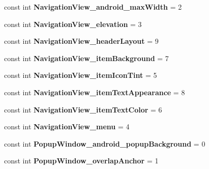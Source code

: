 \begin{DoxyCompactItemize}
const int {\bfseries Navigation\+View\+\_\+android\+\_\+max\+Width} = 2
\item 
\mbox{\label{classXaria_1_1Resource_1_1Styleable_a99ddb40bf037709e678ea5a047f14268}} 
const int {\bfseries Navigation\+View\+\_\+elevation} = 3
\item 
\mbox{\label{classXaria_1_1Resource_1_1Styleable_acf9b70f1c281cb2323373664add60218}} 
const int {\bfseries Navigation\+View\+\_\+header\+Layout} = 9
\item 
\mbox{\label{classXaria_1_1Resource_1_1Styleable_a54bf1ad19ae53e6af6b626752db2a416}} 
const int {\bfseries Navigation\+View\+\_\+item\+Background} = 7
\item 
\mbox{\label{classXaria_1_1Resource_1_1Styleable_a7035fa24c2b69324fc7e63e33483752f}} 
const int {\bfseries Navigation\+View\+\_\+item\+Icon\+Tint} = 5
\item 
\mbox{\label{classXaria_1_1Resource_1_1Styleable_a4ce8339706bb1667fe0dbda9e85a2028}} 
const int {\bfseries Navigation\+View\+\_\+item\+Text\+Appearance} = 8
\item 
\mbox{\label{classXaria_1_1Resource_1_1Styleable_a1bad9d366a692fdf337557ac25cd14fa}} 
const int {\bfseries Navigation\+View\+\_\+item\+Text\+Color} = 6
\item 
\mbox{\label{classXaria_1_1Resource_1_1Styleable_a169ab48e20eacafcbe71a1fc6fea90f0}} 
const int {\bfseries Navigation\+View\+\_\+menu} = 4
\item 
\mbox{\label{classXaria_1_1Resource_1_1Styleable_a0b62981e68137582e148b4e149d1d42d}} 
const int {\bfseries Popup\+Window\+\_\+android\+\_\+popup\+Background} = 0
\item 
\mbox{\label{classXaria_1_1Resource_1_1Styleable_a41510ae2452616a4c6a8bf8bfafdaf8f}} 
const int {\bfseries Popup\+Window\+\_\+overlap\+Anchor} = 1
\item 

\end{DoxyCompactItemize}

